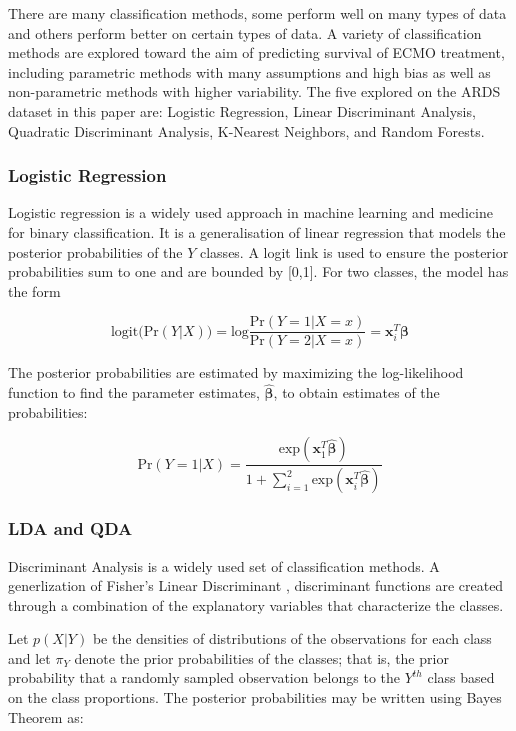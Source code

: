 \documentclass[12pt,]{article}
\begin{document}
There are many classification methods, some perform well on many types
of data and others perform better on certain types of data. A variety of
classification methods are explored toward the aim of predicting
survival of ECMO treatment, including parametric methods with many
assumptions and high bias as well as non-parametric methods with higher
variability. The five explored on the ARDS dataset in this paper are:
Logistic Regression, Linear Discriminant Analysis, Quadratic
Discriminant Analysis, K-Nearest Neighbors, and Random Forests.

\subsubsection{Logistic Regression}\label{logistic-regression}

Logistic regression is a widely used approach in machine learning and
medicine for binary classification. It is a generalisation of linear
regression that models the posterior probabilities of the \(Y\) classes.
A logit link is used to ensure the posterior probabilities sum to one
and are bounded by {[}0,1{]}. For two classes, the model has the form

\[
\text{logit} \Big( \text{Pr}(Y \vert X) \Big) = \text{log} \frac{ \text{Pr}(Y=1 \vert X=x) }{ \text{Pr}(Y=2 \vert X=x) }  = \mathbf{x}^T_i\boldsymbol{\beta}  
\]

The posterior probabilities are estimated by maximizing the
log-likelihood function to find the parameter estimates,
\(\hat{\boldsymbol{\beta}}\), to obtain estimates of the probabilities:

\[
\text{Pr}(Y=1 \vert X) = \frac{ \text{exp}(\mathbf{x}^T_1 \hat{\boldsymbol{\beta}}) }{ 1 + \sum^2_{i=1} \text{exp}(\mathbf{x}^T_i \hat{\boldsymbol{\beta}}) }
\]

\subsubsection{LDA and QDA}\label{lda-and-qda}

Discriminant Analysis is a widely used set of classification methods. A
generlization of Fisher's Linear Discriminant \citep{fisher_use_1936},
discriminant functions are created through a combination of the
explanatory variables that characterize the classes.

Let \(p(X \vert Y)\) be the densities of distributions of the
observations for each class and let \(\pi_Y\) denote the prior
probabilities of the classes; that is, the prior probability that a
randomly sampled observation belongs to the \(Y^{th}\) class based on
the class proportions. The posterior probabilities may be written using
Bayes Theorem as:
\end{document}
